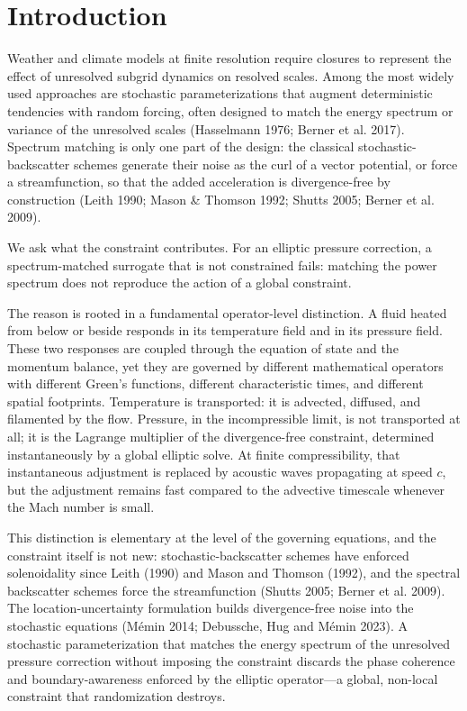 \documentclass[11pt]{article}
\begin{document}
\section{Introduction}

Weather and climate models at finite resolution require closures to represent the effect of unresolved subgrid dynamics on resolved scales. Among the most widely used approaches are stochastic parameterizations that augment deterministic tendencies with random forcing, often designed to match the energy spectrum or variance of the unresolved scales (Hasselmann 1976; Berner et al. 2017). Spectrum matching is only one part of the design: the classical stochastic-backscatter schemes generate their noise as the curl of a vector potential, or force a streamfunction, so that the added acceleration is divergence-free by construction (Leith 1990; Mason \& Thomson 1992; Shutts 2005; Berner et al. 2009).

We ask what the constraint contributes. For an elliptic pressure correction, a spectrum-matched surrogate that is not constrained fails: matching the power spectrum does not reproduce the action of a global constraint.

The reason is rooted in a fundamental operator-level distinction. A fluid heated from below or beside responds in its temperature field and in its pressure field. These two responses are coupled through the equation of state and the momentum balance, yet they are governed by different mathematical operators with different Green's functions, different characteristic times, and different spatial footprints. Temperature is transported: it is advected, diffused, and filamented by the flow. Pressure, in the incompressible limit, is not transported at all; it is the Lagrange multiplier of the divergence-free constraint, determined instantaneously by a global elliptic solve. At finite compressibility, that instantaneous adjustment is replaced by acoustic waves propagating at speed $c$, but the adjustment remains fast compared to the advective timescale whenever the Mach number is small.

This distinction is elementary at the level of the governing equations, and the constraint itself is not new: stochastic-backscatter schemes have enforced solenoidality since Leith (1990) and Mason and Thomson (1992), and the spectral backscatter schemes force the streamfunction (Shutts 2005; Berner et al. 2009). The location-uncertainty formulation builds divergence-free noise into the stochastic equations (M\'emin 2014; Debussche, Hug and M\'emin 2023). A stochastic parameterization that matches the energy spectrum of the unresolved pressure correction without imposing the constraint discards the phase coherence and boundary-awareness enforced by the elliptic operator---a global, non-local constraint that randomization destroys.
\end{document}
